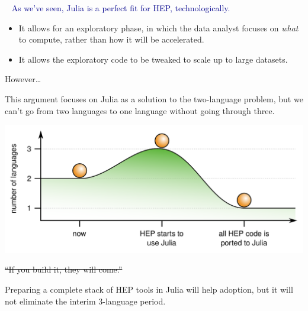 \documentclass[aspectratio=169]{beamer}
\begin{document}
\begin{frame}{\mbox{ }}
\large
\vspace{0.5 cm}
\textcolor{darkblue}{\Large As we've seen, Julia is a perfect fit for HEP, technologically.}

\vspace{0.5 cm}
\begin{itemize}
\item<2-> It allows for an exploratory phase, in which the data analyst focuses on {\it what} to compute, rather than how it will be accelerated.
\item<3-> It allows the exploratory code to be tweaked to scale up to large datasets.
\end{itemize}

\vspace{0.5 cm}
\end{frame}

\begin{frame}{However\ldots}
\vspace{0.5 cm}
\large
\begin{center}
This argument focuses on Julia as a solution to the two-language problem, but we can't go from two languages to one language without going through three.
\end{center}

\vspace{0.25 cm}
\includegraphics[width=\linewidth]{number-of-languages.pdf}
\end{frame}

\begin{frame}{\sout{``If you build it, they will come.''}}

\Large
\vspace{0.6 cm}
Preparing a complete stack of HEP tools in Julia will help adoption, but it will not eliminate the interim 3-language period.

\vspace{0.95 cm}

\large
\vspace{0.95 cm}
\end{frame}
\end{document}
